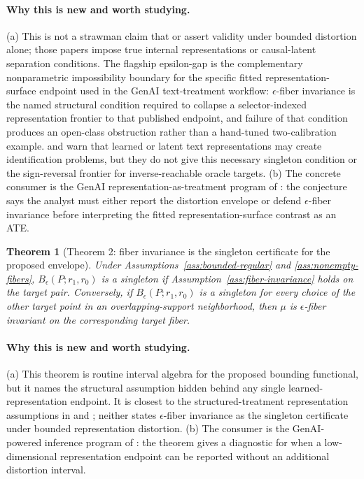 \documentclass[11pt]{article}
\theoremstyle{definition}
\theoremstyle{plain}
\newtheorem{theorem}{Theorem}
\theoremstyle{remark}
\begin{document}
\paragraph{Why this is new and worth studying.}
(a) This is not a strawman claim that \citet{ImaiNakamura2024TextTreatments} or \citet{CorcollAndreuVlontzosORiordanGilliganLee2026} assert validity under bounded distortion alone; those papers impose true internal representations or causal-latent separation conditions.  The flagship epsilon-gap is the complementary nonparametric impossibility boundary for the specific fitted representation-surface endpoint used in the GenAI text-treatment workflow: \(\epsilon\)-fiber invariance is the named structural condition required to collapse a selector-indexed representation frontier to that published endpoint, and failure of that condition produces an open-class obstruction rather than a hand-tuned two-calibration example.  \citet{EgamiFongGrimmerRobertsStewart2022} and \citet{FongGrimmer2023} warn that learned or latent text representations may create identification problems, but they do not give this necessary singleton condition or the sign-reversal frontier for inverse-reachable oracle targets.  (b) The concrete consumer is the GenAI representation-as-treatment program of \citet{ImaiNakamura2024TextTreatments}: the conjecture says the analyst must either report the distortion envelope or defend \(\epsilon\)-fiber invariance before interpreting the fitted representation-surface contrast as an ATE.

\begin{theorem}[Theorem 2: fiber invariance is the singleton certificate for the proposed envelope]\label{thm:fiber-singleton}
Under Assumptions~\ref{ass:bounded-regular} and \ref{ass:nonempty-fibers}, \(B_\epsilon(P;r_1,r_0)\) is a singleton if Assumption~\ref{ass:fiber-invariance} holds on the target pair.  Conversely, if \(B_\epsilon(P;r_1,r_0)\) is a singleton for every choice of the other target point in an overlapping-support neighborhood, then \(\mu\) is \(\epsilon\)-fiber invariant on the corresponding target fiber.
\end{theorem}
\paragraph{Why this is new and worth studying.}
(a) This theorem is routine interval algebra for the proposed bounding functional, but it names the structural assumption hidden behind any single learned-representation endpoint.  It is closest to the structured-treatment representation assumptions in \citet{ImaiNakamura2024TextTreatments} and \citet{CorcollAndreuVlontzosORiordanGilliganLee2026}; neither states \(\epsilon\)-fiber invariance as the singleton certificate under bounded representation distortion.  (b) The consumer is the GenAI-powered inference program of \citet{ImaiNakamura2025GPI}: the theorem gives a diagnostic for when a low-dimensional representation endpoint can be reported without an additional distortion interval.
\end{document}
